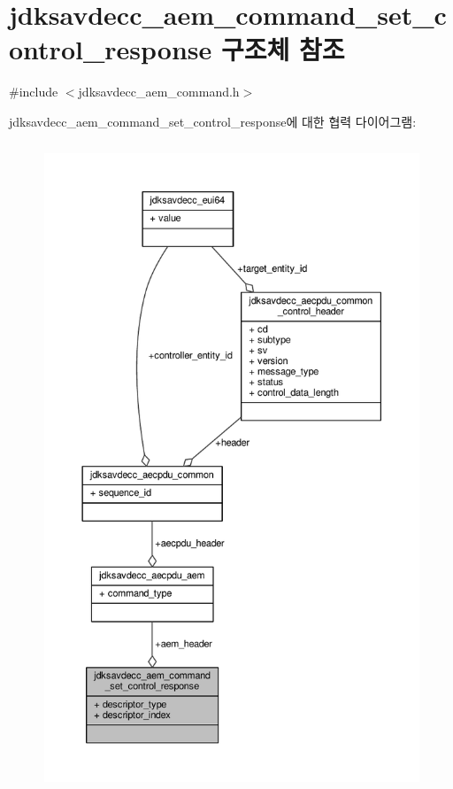 \hypertarget{structjdksavdecc__aem__command__set__control__response}{}\section{jdksavdecc\+\_\+aem\+\_\+command\+\_\+set\+\_\+control\+\_\+response 구조체 참조}
\label{structjdksavdecc__aem__command__set__control__response}


{\ttfamily \#include $<$jdksavdecc\+\_\+aem\+\_\+command.\+h$>$}



jdksavdecc\+\_\+aem\+\_\+command\+\_\+set\+\_\+control\+\_\+response에 대한 협력 다이어그램\+:
\nopagebreak
\begin{figure}[H]
\begin{center}
\leavevmode
\includegraphics[height=550pt]{structjdksavdecc__aem__command__set__control__response__coll__graph}
\end{center}
\end{figure}
